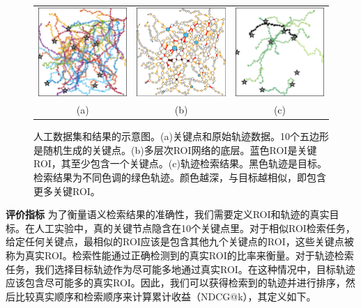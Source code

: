 \tabcolsep=1pt
\begin{figure}[!t]
\centering
\begin{tabular}{ccc}
\includegraphics[width=48mm]{pics/syn1.eps}&
\includegraphics[width=48mm]{pics/syn2.eps}&
\includegraphics[width=48mm]{pics/syn3.eps}\\
(a) & (b) & (c) \\
\end{tabular}
\caption{
人工数据集和结果的示意图。(a)关键点和原始轨迹数据。10个五边形是随机生成的关键点。(b)多层次ROI网络的底层。蓝色ROI是关键ROI，其至少包含一个关键点。(c)轨迹检索结果。黑色轨迹是目标。检索结果为不同色调的绿色轨迹。颜色越深，与目标越相似，即包含更多关键ROI。}
\label{fig:syn}
\end{figure}


\vspace{3mm}
\noindent\textbf{评价指标}
为了衡量语义检索结果的准确性，我们需要定义ROI和轨迹的真实目标。在人工实验中，真的关键节点隐含在10个关键点里。对于相似ROI检索任务，给定任何关键点，最相似的ROI应该是包含其他九个关键点的ROI，这些关键点被称为真实ROI。检索性能通过正确检测到的真实ROI的比率来衡量。对于轨迹检索任务，我们选择目标轨迹作为尽可能多地通过真实ROI。在这种情况中，目标轨迹应该包含尽可能多的真实ROI。因此，我们可以获得检索到的轨迹并进行排序，然后比较真实顺序和检索顺序来计算累计收益（NDCG@k），其定义如下。

